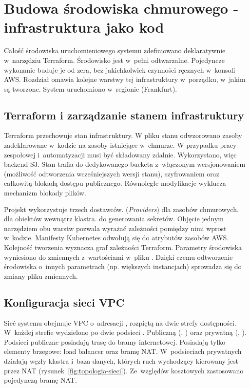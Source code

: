 \chapter{Budowa środowiska chmurowego - infrastruktura jako kod}
\label{chap:infrastruktura}

Całość środowiska uruchomieniowego systemu zdefiniowano deklaratywnie w~narzędziu Terraform.
Środowisko jest w~pełni odtwarzalne. Pojedyncze wykonanie 
buduje je od zera, bez jakichkolwiek czynności ręcznych w~konsoli AWS. Rozdział omawia kolejne warstwy tej
infrastruktury w~porządku, w~jakim są tworzone. System uruchomiono w~regionie  (Frankfurt).

\section{Terraform i zarządzanie stanem infrastruktury}
\label{sec:terraform-stan}

Terraform przechowuje stan infrastruktury. W pliku stanu odwzorowano zasoby zadeklarowane w~kodzie na zasoby istniejące
w~chmurze. W przypadku pracy zespołowej i~automatyzacji musi być składowany zdalnie. Wykorzystano, więc
backend S3. Stan trafia do dedykowanego bucketa z~włączonym wersjonowaniem (możliwość odtworzenia wcześniejszych
wersji stanu), szyfrowaniem oraz całkowitą blokadą dostępu publicznego. Równoległe modyfikacje wyklucza
mechanizm blokady plików.

Projekt wykorzystuje trzech dostawców. (\emph{Providers})  dla zasobów chmurowych. 
dla obiektów wewnątrz klastra.  do generowania sekretów.
Objęcie jednym narzędziem obu warstw pozwala wyrażać zależności pomiędzy nimi wprost w~kodzie. Manifesty Kubernetes 
odwołują się do atrybutów zasobów AWS. Kolejność tworzenia wyznacza graf zależności Terraform. 
Parametry środowiska wyniesiono do zmiennych z~wartościami w~pliku .
Dzięki czemu odtworzenie środowiska o~innych parametrach (np. większych instancjach)
sprowadza się do zmiany pliku zmiennych.

\section{Konfiguracja sieci VPC}
\label{sec:konfiguracja-vpc}

Sieć systemu obejmuje VPC o~adresacji , rozpiętą na dwie strefy dostępności. W~każdej strefie
wydzielono po dwie podsieci .
Publiczną (, ) oraz prywatną (, ).
Podsieci publiczne posiadają trasę do bramy internetowej. Posiadają tylko elementy brzegowe: load balancer
oraz bramę NAT. W~podsieciach prywatnych działają węzły klastra i~baza danych, których ruch wychodzący
kierowany jest przez NAT (rysunek~\ref{fig:topologia-sieci}). Ze~względów kosztowych zastosowano pojedynczą bramę NAT.

